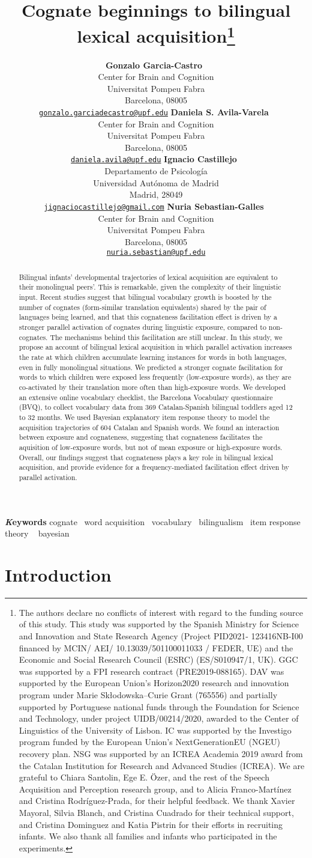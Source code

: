 \documentclass[
]{article}
\title{Cognate beginnings to bilingual lexical acquisition\thanks{The
authors declare no conflicts of interest with regard to the funding
source of this study. This study was supported by the Spanish Ministry
for Science and Innovation and State Research Agency (Project PID2021-
123416NB-I00 financed by MCIN/ AEI/ 10.13039/501100011033 / FEDER, UE)
and the Economic and Social Research Council (ESRC) (ES/S010947/1, UK).
GGC was supported by a FPI research contract (PRE2019-088165). DAV was
supported by the European Union's Horizon2020 research and innovation
program under Marie Skłodowska--Curie Grant (765556) and partially
supported by Portuguese national funds through the Foundation for
Science and Technology, under project UIDB/00214/2020, awarded to the
Center of Linguistics of the University of Lisbon. IC was supported by
the Investigo program funded by the European Union's NextGenerationEU
(NGEU) recovery plan. NSG was supported by an ICREA Academia 2019 award
from the Catalan Institution for Research and Advanced Studies (ICREA).
We are grateful to Chiara Santolin, Ege E. Özer, and the rest of the
Speech Acquisition and Perception research group, and to Alicia
Franco-Martínez and Cristina Rodríguez-Prada, for their helpful
feedback. We thank Xavier Mayoral, Silvia Blanch, and Cristina Cuadrado
for their technical support, and Cristina Dominguez and Katia Pistrin
for their efforts in recruiting infants. We also thank all families and
infants who participated in the experiments.}}
\author{
\textbf{Gonzalo Garcia-Castro}~\orcidlink{0000-0002-8553-4209}\\Center
for Brain and Cognition\\Universitat Pompeu Fabra\\Barcelona,
08005\\\texttt{\href{mailto:gonzalo.garciadecastro@upf.edu}{gonzalo.garciadecastro@upf.edu}}\And
\textbf{Daniela S. Avila-Varela}~\orcidlink{0000-0002-3518-8117}\\Center
for Brain and Cognition\\Universitat Pompeu Fabra\\Barcelona,
08005\\\texttt{\href{mailto:daniela.avila@upf.edu}{daniela.avila@upf.edu}}\And
\textbf{Ignacio
Castillejo}~\orcidlink{0000-0001-7445-0416}\\Departamento de
Psicología\\Universidad Autónoma de Madrid\\Madrid,
28049\\\texttt{\href{mailto:jignaciocastillejo@gmail.com}{jignaciocastillejo@gmail.com}}\And
\textbf{Nuria Sebastian-Galles}~\orcidlink{0000-0001-6938-2498}\\Center
for Brain and Cognition\\Universitat Pompeu Fabra\\Barcelona,
08005\\\texttt{\href{mailto:nuria.sebastian@upf.edu}{nuria.sebastian@upf.edu}}}
\date{}
\begin{document}
\maketitle
\begin{abstract}
Bilingual infants' developmental trajectories of lexical acquisition are
equivalent to their monolingual peers'. This is remarkable, given the
complexity of their linguistic input. Recent studies suggest that
bilingual vocabulary growth is boosted by the number of cognates
(form-similar translation equivalents) shared by the pair of languages
being learned, and that this cognateness facilitation effect is driven
by a stronger parallel activation of cognates during linguistic
exposure, compared to non-cognates. The mechanisms behind this
facilitation are still unclear. In this study, we propose an account of
bilingual lexical acquisition in which parallel activation increases the
rate at which children accumulate learning instances for words in both
languages, even in fully monolingual situations. We predicted a stronger
cognate facilitation for words to which children were exposed less
frequently (low-exposure words), as they are co-activated by their
translation more often than high-exposure words. We developed an
extensive online vocabulary checklist, the Barcelona Vocabulary
questionnaire (BVQ), to collect vocabulary data from 369 Catalan-Spanish
bilingual toddlers aged 12 to 32 months. We used Bayesian explanatory
item response theory to model the acquisition trajectories of 604
Catalan and Spanish words. We found an interaction between exposure and
cognateness, suggesting that cognateness facilitates the aquisition of
low-exposure words, but not of mean exposure or high-exposure words.
Overall, our findings suggest that cognateness plays a key role in
bilingual lexical acquisition, and provide evidence for a
frequency-mediated facilitation effect driven by parallel activation.
\end{abstract}
{\bfseries \emph Keywords}
\def\sep{\textbullet\ }
cognate \sep word
acquisition \sep vocabulary \sep bilingualism \sep item response
theory \sep 
bayesian

\ifdefined\Shaded\renewenvironment{Shaded}{\begin{tcolorbox}[boxrule=0pt, frame hidden, sharp corners, interior hidden, enhanced, borderline west={3pt}{0pt}{shadecolor}, breakable]}{\end{tcolorbox}}\fi

\hypertarget{introduction}{%
\section{Introduction}\label{introduction}}
\end{document}
